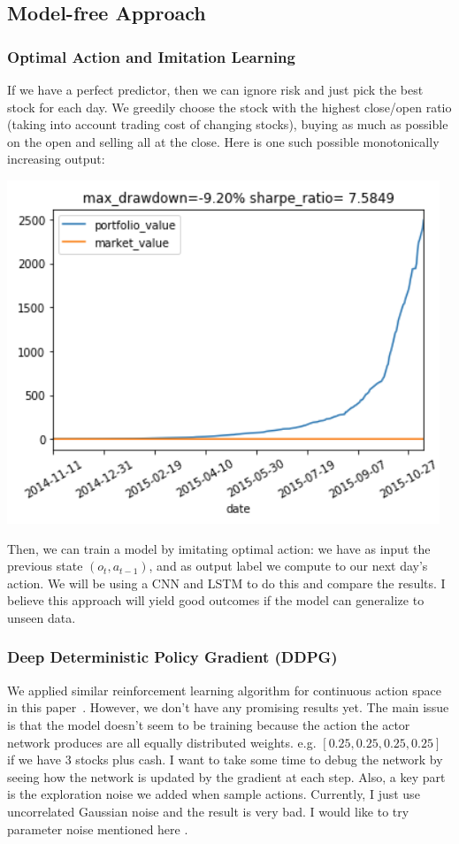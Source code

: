 \documentclass[a4paper, 10pt]{article}
\begin{document}
\begin{spacing}{1.2}
    \subsection{Model-free Approach}
    \subsubsection{Optimal Action and Imitation Learning}
    If we have a perfect predictor, then we can ignore risk and just pick the best stock for each day. We greedily choose the stock with the highest close/open ratio (taking into account trading cost of changing stocks), buying as much as possible on the open and selling all at the close. Here is one such possible monotonically increasing output: 
    
    \includegraphics[scale=0.5]{Optimal_with_trading_cost.png}
    
    Then, we can train a model by imitating optimal action: we have as input the previous state $(o_t, a_{t-1})$, and as output label we compute to our next day's action. We will be using a CNN and LSTM to do this and compare the results. I believe this approach will yield good outcomes if the model can generalize to unseen data.
    
    \subsubsection{Deep Deterministic Policy Gradient (DDPG)}
    We applied similar reinforcement learning algorithm for continuous action space in this paper~\cite{DBLP:journals/corr/LillicrapHPHETS15}. However, we don't have any promising results yet. The main issue is that the model doesn't seem to be training because the action the actor network produces are all equally distributed weights. e.g. $[0.25, 0.25, 0.25, 0.25]$ if we have 3 stocks plus cash. I want to take some time to debug the network by seeing how the network is updated by the gradient at each step. Also, a key part is the exploration noise we added when sample actions. Currently, I just use uncorrelated Gaussian noise and the result is very bad. I would like to try parameter noise mentioned here \cite{DBLP:journals/corr/PlappertHDSCCAA17}. 
    

\end{spacing}
\end{document}
